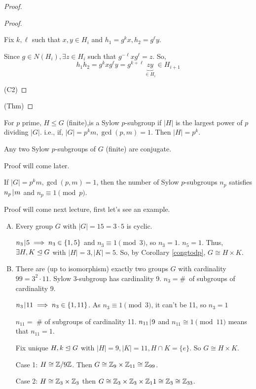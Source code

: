 \documentclass[notes.tex]{subfiles}
\begin{document}
\begin{proof}
\begin{proof}
\begin{itemize}
		Fix $k, \ell $ such that $x, y \in H_i$ and $h_1 = g^kx, h_2 = g^\ell y$.

		Since $g\in N(H_i), \exists z\in H_i$ such that $g^{-\ell}xg^\ell = z$.
		So, \[h_1h_2 = g^kxg^\ell y = g^{k+\ell}\underbrace{zy}_{\in H_i} \in H_{i+1}\] 
	\end{itemize}
	\qedhere(C2)
	\end{proof}
	\qedhere(Thm)
\end{proof}

\begin{defn}
	For $p$ prime, $H\le G$ (finite),is a Sylow $p$-subgroup if $|H|$ is the largest power of $p$ dividing $|G|$.
	i.e., if, $|G| = p^km, \gcd(p, m) = 1$. Then $|H| = p^k$.
\end{defn}

\begin{theorem}[Sylow 2]
\label{sylow2} Any two Sylow $p$-subgroups of $G$ (finite) are conjugate.
\end{theorem}
Proof will come later.

\begin{theorem}[Sylow 3]
	\label{sylow3}
	If $|G| = p^km, \gcd(p, m) = 1$, then the number of Sylow $p$-subgroups $n_p$ satisfies $n_p \mkern2mu|\mkern1mu m$ and $n_p\equiv 1 \pmod p$. 
\end{theorem}

Proof will come next lecture, first let's see an example.
\begin{eg}\leavevmode
	\begin{enumerate}[A)]
		\item Every group $G$ with $|G| = 15 = 3\cdot 5$ is cyclic.

		$n_3 \mkern2mu|\mkern1mu 5 \implies n_3 \in \{1, 5\}$ and $n_3 \equiv 1 \pmod 3$, so $n_3 = 1$.
		$n_5 = 1$. Thus, $\exists H, K\trianglelefteq G$ with $|H| = 3, |K| = 5$. So, by Corollary \ref{congtodp}, $G\cong H\times K$.
		\item There are (up to isomorphism) exactly two groups $G$ with cardinality $99 = 3^2\cdot 11$.
		Sylow 3-subgroup has cardinality 9. $n_3 = $\#~of subgroups of cardinality 9.

		$n_3 \mkern2mu|\mkern1mu 11\implies n_3\in \{1, 11\}$. As $n_3 \equiv 1\pmod 3$, it can't be 11, so $n_3 = 1$

		$n_{11} = $ \# of subgroups of cardinality 11. $n_{11} \mkern2mu|\mkern1mu 9$ and $n_{11}\cong 1 \pmod 11$ means that $n_{11} = 1$.

		Fix unique $H, k\trianglelefteq G$ with $|H| = 9, |K| = 11, H\cap K = \{e\}$.
		So $G \cong H\times K$.

		Case 1: $H\cong \mathbb{Z}/9\mathbb{Z}$. Then $G\cong \mathbb{Z}_9\times \mathbb{Z}_{11} \cong \mathbb{Z}_{99}$.

		Case 2: $H\cong \mathbb{Z}_3\times \mathbb{Z}_3$ then $G \cong \mathbb{Z}_3\times\mathbb{Z}_3 \times \mathbb{Z}_11\cong \mathbb{Z}_3\cong \mathbb{Z}_{33}$.
	\end{enumerate}
\end{eg}
\end{document}
